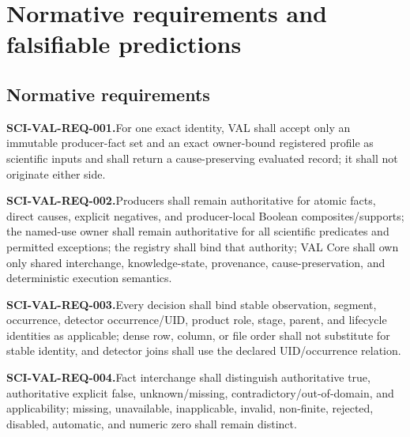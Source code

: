 \section{Normative requirements and falsifiable predictions}
\label{sec:requirements}

\newcommand{\ContractRequirement}[2]{%
  \par\medskip\noindent\begin{minipage}{\linewidth}%
  \textbf{SCI-VAL-REQ-#1.}\quad #2%
  \end{minipage}\par}
\newcommand{\ContractPrediction}[2]{%
  \par\medskip\noindent\begin{minipage}{\linewidth}%
  \textbf{SCI-VAL-PRED-#1.}\quad #2%
  \end{minipage}\par}

\subsection{Normative requirements}

\ContractRequirement{001}{For one exact identity, VAL shall accept only an
immutable producer-fact set and an exact owner-bound registered profile as
scientific inputs and shall return a cause-preserving evaluated record; it
shall not originate either side.}

\ContractRequirement{002}{Producers shall remain authoritative for atomic
facts, direct causes, explicit negatives, and producer-local Boolean
composites/supports; the named-use owner shall remain authoritative for all
scientific predicates and permitted exceptions; the registry shall bind that
authority; VAL Core shall own only shared interchange, knowledge-state,
provenance, cause-preservation, and deterministic execution semantics.}

\ContractRequirement{003}{Every decision shall bind stable observation,
segment, occurrence, detector occurrence/UID, product role, stage, parent,
and lifecycle identities as applicable; dense row, column, or file order
shall not substitute for stable identity, and detector joins shall use the
declared UID/occurrence relation.}

\ContractRequirement{004}{Fact interchange shall distinguish authoritative
true, authoritative explicit false, unknown/missing,
contradictory/out-of-domain, and applicability; missing, unavailable,
inapplicable, invalid, non-finite, rejected, disabled, automatic, and numeric
zero shall remain distinct.}

